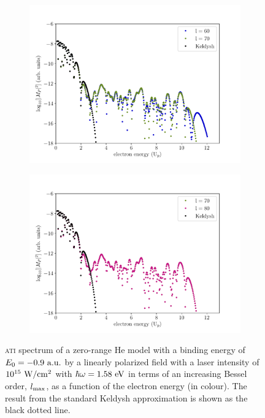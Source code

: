 \begin{figure}
\begin{subfigure}[b]{0.5\linewidth}
  \includegraphics[width=\textwidth]{figures/ch_ATI_SFA/He/l6070n512WP40PG25MR35vsKeldysh.pdf}
\end{subfigure}
\begin{subfigure}[b]{0.5\linewidth}
  \includegraphics[width=\textwidth]{figures/ch_ATI_SFA/He/l7080n512WP40PG25MR35vsKeldysh.pdf}
\end{subfigure}
\caption{\textsc{ati} spectrum of a zero-range He model with a binding
  energy of $E_{0} = -0.9\ \rm{a.u.}$ by a linearly polarized field
  with a laser intensity of $10^{15}\ \rm{W/cm^{2}}$ with $\hbar\omega
  = 1.58\ \rm{eV}$ in terms of an increasing Bessel order,
  $l_{\rm{max}}$, as a function of the electron energy (in
  colour). The result from the standard Keldysh approximation is shown
  as the black dotted line.}
  \label{fig:mp_convergence}
\end{figure}


